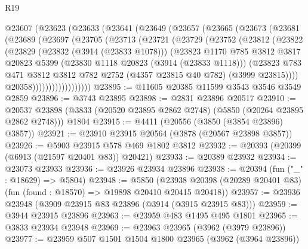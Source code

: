 \begin{lexlean}{R19}
\begin{coremodule}
    @23607
      (@23623
        (@23633
          (@23641
            (@23649
              (@23657
                (@23665
                  (@23673
                    (@23681
                      (@23689
                        (@23697
                          (@23705
                            (@23713
                              (@23721
                                (@23729
                                  (@23752
                                    (@23812
                                      (@23822
                                        (@23829
                                          (@23832 (@3914 (@23833 @1078)))
                                          (@23823
                                            @1170
                                            @785
                                            @3812
                                            @3817
                                            @20823
                                            @5399
                                            (@23830 @1118 @20823 (@3914 (@23833 @1118)))
                                            (@23823
                                              @783
                                              @471
                                              @3812
                                              @3812
                                              @782
                                              @2752
                                              (@4357 @23815 @40 @782)
                                              (@3999 @23815))))
                                        @20358))))))))))))))))))
@23895 := @11605 @20385 @11599 @3543 @3546 @3549 @2859
@23896 := @3743 @23895
@23898 := @2831 @23896 @20517
@23910 := @20537
    @23898
    (@3833 (@20520 @23895 @2862 @2748) (@5850 (@20264 @23895 @2862 @2748)))
    @1804
@23915 := @4411 (@20556 (@3850 (@3854 @23896) @3857))
@23921 := @23910 @23915 @20564 (@3878 (@20567 @23898 @3857))
@23926 := @5903 @23915 @578 @469 @1802 @3812
@23932 := @20393 (@20399 (@6913 (@21597 @20401 @83)) @20421)
@23933 := @20389 @23932
@23934 := @23073 @23933
@23936 := @23926 @23934 @23896
@23938 := @20394 (fun ("_" : @18629) => @5804)
@23948 := @5850
    (@23938 @20398 (@20289 @20401 @83) (fun (found : @18570) => @19898 @20410 @20415 @20418))
@23957 := @23936 @23948 (@3909 @23915 @83 @23896 (@3914 (@3915 @23915 @83)))
@23959 := @3944 @23915 @23896
@23963 := @23959 @483 @1495 @495 @1801
@23965 := @3833 @23934 @23948
@23969 := @23963 @23965 (@3962 (@3979 @23896))
@23977 := @23959 @507 @1501 @1504 @1800 @23965 (@3962 (@3964 @23896))

\end{coremodule}
\end{lexlean}
